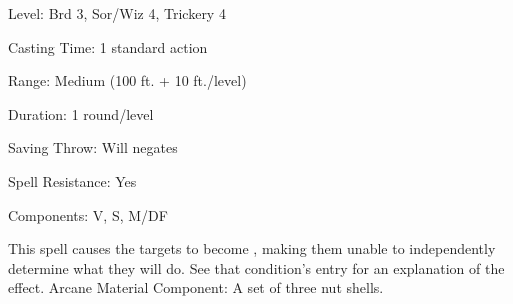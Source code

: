 
\begin{description*}
\item[Level:] Brd 3, Sor/Wiz 4, Trickery 4
\item[Casting Time:] 1 standard action
\item[Range:] Medium (100 ft. + 10 ft./level)
\item[Duration:] 1 round/level
\item[Saving Throw:] Will negates
\item[Spell Resistance:] Yes
\item[Components:] V, S, M/DF
\end{description*}

This spell causes the targets to become , making them unable to
independently determine what they will do. See that condition's entry for an explanation of the effect.
Arcane Material Component: A set of three nut shells.